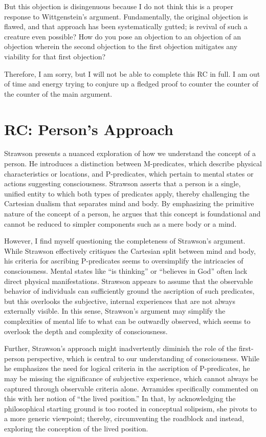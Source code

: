 \documentclass[11pt]{article}
\begin{document}
But this objection is disingenuous because I do not think this is a proper response to Wittgenstein's argument. Fundamentally, the original objection is flawed, and that approach has been systematically gutted; is revival of such a creature even possible? How do you pose an objection to an objection of an objection wherein the second objection to the first objection mitigates any viability for that first objection? 

Therefore, I am sorry, but I will not be able to complete this RC in full. I am out of time and energy trying to conjure up a fledged proof to counter the counter of the counter of the main argument. 

\section{RC: Person's Approach}

Strawson presents a nuanced exploration of how we understand the concept of a person. He introduces a distinction between M-predicates, which describe physical characteristics or locations, and P-predicates, which pertain to mental states or actions suggesting consciousness. Strawson asserts that a person is a single, unified entity to which both types of predicates apply, thereby challenging the Cartesian dualism that separates mind and body. By emphasizing the primitive nature of the concept of a person, he argues that this concept is foundational and cannot be reduced to simpler components such as a mere body or a mind. 

However, I find myself questioning the completeness of Strawson's argument. While Strawson effectively critiques the Cartesian split between mind and body, his criteria for ascribing P-predicates seems to oversimplify the intricacies of consciousness. Mental states like ``is thinking'' or ``believes in God'' often lack direct physical manifestations. Strawson appears to assume that the observable behavior of individuals can sufficiently ground the ascription of such predicates, but this overlooks the subjective, internal experiences that are not always externally visible. In this sense, Strawson's argument may simplify the complexities of mental life to what can be outwardly observed, which seems to overlook the depth and complexity of consciousness. 

Further, Strawson's approach might inadvertently diminish the role of the first-person perspective, which is central to our understanding of consciousness. While he emphasizes the need for logical criteria in the ascription of P-predicates, he may be missing the significance of subjective experience, which cannot always be captured through observable criteria alone. Avramides specifically commented on this with her notion of ``the lived position.'' In that, by acknowledging the philosophical starting ground is too rooted in conceptual solipsism, she pivots to a more generic viewpoint; thereby, circumventing the roadblock and instead, exploring the conception of the lived position. 
\end{document}
